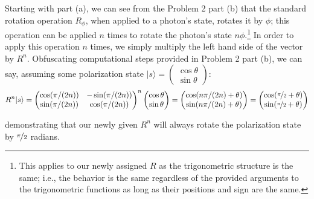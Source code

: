 \documentclass[12pt]{article}
\newenvironment{answer}
    {\begin{adjustwidth}{0pt}{0pt}}
    {\end{adjustwidth}}
\theoremstyle{remark}  %
\begin{document}
    \begin{answer}
        Starting with part (a), we can see from the Problem 2 part (b) that the standard rotation operation $R_\phi$, when applied to a photon's state, rotates it by $\phi$; this operation can be applied $n$ times to rotate the photon's state $n\phi$.\footnote{This applies to our newly assigned $R$ as the trigonometric structure is the same; i.e., the behavior is the same regardless of the provided arguments to the trigonometric functions as long as their positions and sign are the same.} In order to apply this operation $n$ times, we simply multiply the left hand side of the vector by $R^n$. Obfuscating computational steps provided in Problem 2 part (b), we can say, assuming some polarization state $|s\rangle = \left(\begin{smallmatrix}
            \cos\theta \\
            \sin\theta
        \end{smallmatrix}\right)$: $$
            R^n|s\rangle = \begin{pmatrix}
                \cos(\pi/(2n)) & -\sin(\pi/(2n)) \\
                \sin(\pi/(2n)) & \cos(\pi/(2n))
            \end{pmatrix}^n\begin{pmatrix}
                \cos\theta \\
                \sin\theta
            \end{pmatrix} = \begin{pmatrix}
                \cos(n\pi/(2n) + \theta) \\
                \sin(n\pi/(2n) + \theta)
            \end{pmatrix} = \begin{pmatrix}
                \cos(\nicefrac{\pi}{2} + \theta) \\
                \sin(\nicefrac{\pi}{2} + \theta)
            \end{pmatrix}
        $$
    \end{answer} demonstrating that our newly given $R^n$ will always rotate the polarization state by $\nicefrac{\pi}{2}$ radians.
\setcounter{subsubsection}{2}
\end{document}

